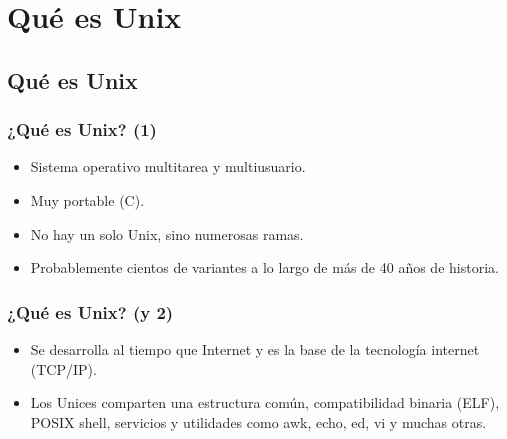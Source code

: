 \documentclass{beamer}
\begin{document}


\normalsize



\section{Qué es Unix}
\subsection{Qué es Unix}
\begin{frame}
\frametitle{¿Qué es Unix? (1)}

\begin{itemize}
\item Sistema operativo multitarea y multiusuario. 
\item Muy portable (C). 
\item No hay un solo Unix, sino numerosas ramas. 
\item Probablemente cientos de variantes a lo largo de más de 40 años de historia.
\end{itemize}

\end{frame}


\begin{frame}
\frametitle{¿Qué es Unix? (y 2)}

\begin{itemize}
\item Se desarrolla al tiempo que Internet y es la base de la tecnología internet (TCP/IP).
\item Los Unices comparten una estructura común, compatibilidad binaria (ELF), POSIX shell, servicios y utilidades como awk, echo, ed, vi y muchas otras.
\end{itemize}

\end{frame}


\end{document}
